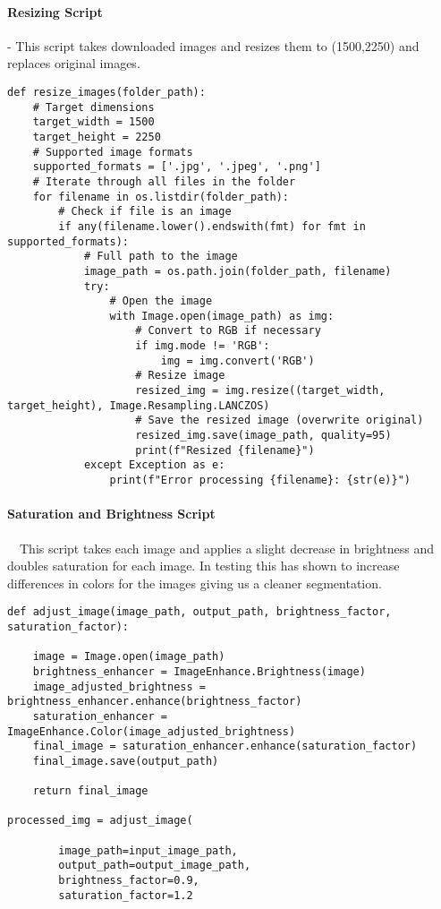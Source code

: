 \documentclass{article}
\begin{document}
\paragraph{Resizing Script}
- This script takes downloaded images and resizes them to (1500,2250) and replaces original images. 

\begingroup\footnotesize
\begin{verbatim}
def resize_images(folder_path):
    # Target dimensions
    target_width = 1500
    target_height = 2250
    # Supported image formats
    supported_formats = ['.jpg', '.jpeg', '.png']
    # Iterate through all files in the folder
    for filename in os.listdir(folder_path):
        # Check if file is an image
        if any(filename.lower().endswith(fmt) for fmt in supported_formats):
            # Full path to the image
            image_path = os.path.join(folder_path, filename)
            try:
                # Open the image
                with Image.open(image_path) as img:
                    # Convert to RGB if necessary
                    if img.mode != 'RGB':
                        img = img.convert('RGB')
                    # Resize image
                    resized_img = img.resize((target_width, target_height), Image.Resampling.LANCZOS)
                    # Save the resized image (overwrite original)
                    resized_img.save(image_path, quality=95)
                    print(f"Resized {filename}")
            except Exception as e:
                print(f"Error processing {filename}: {str(e)}")
\end{verbatim}
\endgroup

\paragraph{Saturation and Brightness Script}
$\quad$This script takes each image and applies a slight decrease in brightness and doubles saturation for each image. In testing this has shown to increase differences in colors for the images giving us a cleaner segmentation.

\begingroup\footnotesize
\begin{verbatim}
def adjust_image(image_path, output_path, brightness_factor, saturation_factor):

    image = Image.open(image_path)
    brightness_enhancer = ImageEnhance.Brightness(image)
    image_adjusted_brightness = brightness_enhancer.enhance(brightness_factor)
    saturation_enhancer = ImageEnhance.Color(image_adjusted_brightness)
    final_image = saturation_enhancer.enhance(saturation_factor)
    final_image.save(output_path)

    return final_image

processed_img = adjust_image(

        image_path=input_image_path,
        output_path=output_image_path,
        brightness_factor=0.9,
        saturation_factor=1.2
\end{verbatim}
\endgroup
\end{document}
